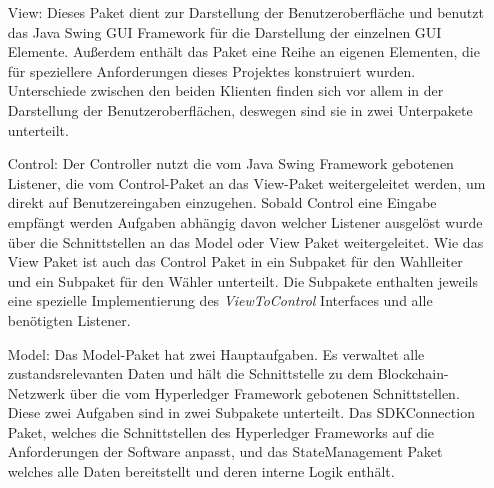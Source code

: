 \documentclass[parskip=full]{scrartcl}
\newcommand{\textitx}[1]{\mbox{\textit{#1}}}
\begin{document}
	\begin{itemize}
		\item[View:] Dieses Paket dient zur Darstellung der Benutzeroberfläche und benutzt das Java Swing GUI Framework für die Darstellung der einzelnen GUI Elemente. Außerdem enthält das Paket eine Reihe an eigenen Elementen, die für speziellere Anforderungen dieses Projektes konstruiert wurden. Unterschiede zwischen den beiden Klienten finden sich vor allem in der Darstellung der Benutzeroberflächen, deswegen sind sie in zwei Unterpakete unterteilt.
		\item[Control:] Der Controller nutzt die vom Java Swing Framework gebotenen Listener, die vom Control-Paket an das View-Paket weitergeleitet werden, um direkt auf Benutzereingaben einzugehen. Sobald Control eine Eingabe empfängt werden Aufgaben abhängig davon welcher Listener ausgelöst wurde über die Schnittstellen an das Model oder View Paket weitergeleitet. Wie das View Paket ist auch das Control Paket in ein Subpaket für den Wahlleiter und ein Subpaket für den Wähler unterteilt. Die Subpakete enthalten jeweils eine spezielle Implementierung des \textitx{ViewToControl} Interfaces und alle benötigten Listener.
		\item[Model:] Das Model-Paket hat zwei Hauptaufgaben. Es verwaltet alle zustandsrelevanten Daten und hält die Schnittstelle zu dem Blockchain-Netzwerk über die vom Hyperledger Framework gebotenen Schnittstellen. Diese zwei Aufgaben sind in zwei Subpakete unterteilt. Das SDKConnection Paket, welches die Schnittstellen des Hyperledger Frameworks auf die Anforderungen der Software anpasst, und das StateManagement Paket welches alle Daten bereitstellt und deren interne Logik enthält.   
	\end{itemize} 
\end{document}
